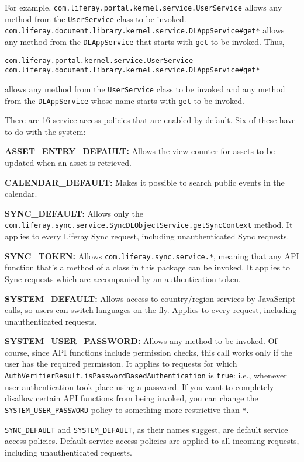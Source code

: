For example, \texttt{com.liferay.portal.kernel.service.UserService}
allows any method from the \texttt{UserService} class to be invoked.
\texttt{com.liferay.document.library.kernel.service.DLAppService\#get*}
allows any method from the \texttt{DLAppService} that starts with
\texttt{get} to be invoked. Thus,

\begin{verbatim}
com.liferay.portal.kernel.service.UserService
com.liferay.document.library.kernel.service.DLAppService#get*
\end{verbatim}

allows any method from the \texttt{UserService} class to be invoked and
any method from the \texttt{DLAppService} whose name starts with
\texttt{get} to be invoked.

There are 16 service access policies that are enabled by default. Six of
these have to do with the system:

\textbf{ASSET\_ENTRY\_DEFAULT:} Allows the view counter for assets to be
updated when an asset is retrieved.

\textbf{CALENDAR\_DEFAULT:} Makes it possible to search public events in
the calendar.

\textbf{SYNC\_DEFAULT:} Allows only the
\texttt{com.liferay.sync.service.SyncDLObjectService.getSyncContext}
method. It applies to every Liferay Sync request, including
unauthenticated Sync requests.

\textbf{SYNC\_TOKEN:} Allows \texttt{com.liferay.sync.service.*},
meaning that any API function that's a method of a class in this package
can be invoked. It applies to Sync requests which are accompanied by an
authentication token.

\textbf{SYSTEM\_DEFAULT:} Allows access to country/region services by
JavaScript calls, so users can switch languages on the fly. Applies to
every request, including unauthenticated requests.

\textbf{SYSTEM\_USER\_PASSWORD:} Allows any method to be invoked. Of
course, since API functions include permission checks, this call works
only if the user has the required permission. It applies to requests for
which \texttt{AuthVerifierResult.isPasswordBasedAuthentication} is
\texttt{true}: i.e., whenever user authentication took place using a
password. If you want to completely disallow certain API functions from
being invoked, you can change the \texttt{SYSTEM\_USER\_PASSWORD} policy
to something more restrictive than \texttt{*}.

\texttt{SYNC\_DEFAULT} and \texttt{SYSTEM\_DEFAULT}, as their names
suggest, are default service access policies. Default service access
policies are applied to all incoming requests, including unauthenticated
requests.

